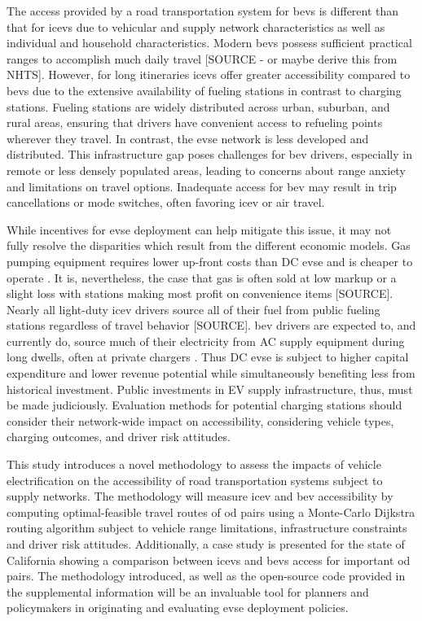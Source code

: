 \documentclass[11pt]{article}
\begin{document}
\begin{multicols}{2}
The access provided by a road transportation system for \glspl{bev} is different than that for \glspl{icev} due to vehicular and supply network characteristics as well as individual and household characteristics. Modern \glspl{bev} possess sufficient practical ranges to accomplish much daily travel [SOURCE - or maybe derive this from NHTS]. However, for long itineraries \glspl{icev} offer greater accessibility compared to \glspl{bev} due to the extensive availability of fueling stations in contrast to charging stations. Fueling stations are widely distributed across urban, suburban, and rural areas, ensuring that drivers have convenient access to refueling points wherever they travel. In contrast, the \gls{evse} network is less developed and distributed. This infrastructure gap poses challenges for \gls{bev} drivers, especially in remote or less densely populated areas, leading to concerns about range anxiety and limitations on travel options. Inadequate access for \gls{bev} may result in trip cancellations or mode switches, often favoring \gls{icev} or air travel.

While incentives for \gls{evse} deployment can help mitigate this issue, it may not fully resolve the disparities which result from the different economic models. Gas pumping equipment requires lower up-front costs than DC \gls{evse} and is cheaper to operate \cite{Gamage_2023}. It is, nevertheless, the case that gas is often sold at low markup or a slight loss with stations making most profit on convenience items [SOURCE]. Nearly all light-duty \gls{icev} drivers source all of their fuel from public fueling stations regardless of travel behavior [SOURCE]. \gls{bev} drivers are expected to, and currently do, source much of their electricity from AC supply equipment during long dwells, often at private chargers \cite{Hardman_2018}. Thus DC \gls{evse} is subject to higher capital expenditure and lower revenue potential while simultaneously benefiting less from historical investment. Public investments in EV supply infrastructure, thus, must be made judiciously. Evaluation methods for potential charging stations should consider their network-wide impact on accessibility, considering vehicle types, charging outcomes, and driver risk attitudes.

This study introduces a novel methodology to assess the impacts of vehicle electrification on the accessibility of road transportation systems subject to supply networks. The methodology will measure \gls{icev} and \gls{bev} accessibility by computing optimal-feasible travel routes of \gls{od} pairs using a Monte-Carlo Dijkstra routing algorithm subject to vehicle range limitations, infrastructure constraints and driver risk attitudes. Additionally, a case study is presented for the state of California showing a comparison between \glspl{icev} and \glspl{bev} access for important \gls{od} pairs. The methodology introduced, as well as the open-source code provided in the supplemental information will be an invaluable tool for planners and policymakers in originating and evaluating \gls{evse} deployment policies.


\end{multicols}
\end{document}
